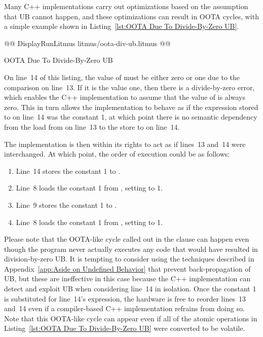 \documentclass[10]{article}
\begin{document}
Many C++ implementations carry out optimizations based on the assumption
that UB cannot happen, and these optimizations can result in OOTA cycles,
with a simple example shown in
Listing~\ref{lst:OOTA Due To Divide-By-Zero UB}.

\begin{listing}[tbp]
@@ DisplayRunLitmus litmus/oota-div-ub.litmus @@
\caption{OOTA Due To Divide-By-Zero UB}
\label{lst:OOTA Due To Divide-By-Zero UB}
\end{listing}

On line~14 of this listing, the value of  must be either zero
or one due to the comparison on line~13.
If it is the value one, then there is a divide-by-zero error, which
enables the C++ implementation to assume that the value of  is
always zero.
This in turn allows the implementation to behave as if the expression
stored to  on line~14 was the constant 1, at which point there
is no semantic dependency from the load from  on line~13 to the
store to  on line~14.

The implementation is then within its rights to act as if lines~13 and~14
were interchanged.
At which point, the order of execution could be as follows:

\begin{enumerate}
\item	Line~14 stores the constant 1 to .
\item	Line~8 loads the constant 1 from , setting  to 1.
\item	Line~9 stores the constant 1 to .
\item	Line~8 loads the constant 1 from , setting  to 1.
\end{enumerate}

Please note that the OOTA-like cycle called out in the 
clause can happen even though the program never actually executes any
code that would have resulted in division-by-zero UB.
It is tempting to consider using the techniques described in
Appendix~\ref{app:Aside on Undefined Behavior}
that prevent back-propagation of UB, but these are ineffective in this
case because the C++ implementation can detect and exploit UB when
considering line~14 in isolation.
Once the constant 1 is substituted for line~14's expression, the
hardware is free to reorder lines~13 and~14 even if a compiler-based
C++ implementation refrains from doing so.
Note that this OOTA-like cycle can appear even if all of the atomic
operations in
Listing~\ref{lst:OOTA Due To Divide-By-Zero UB}
were converted to be volatile.
\end{document}
